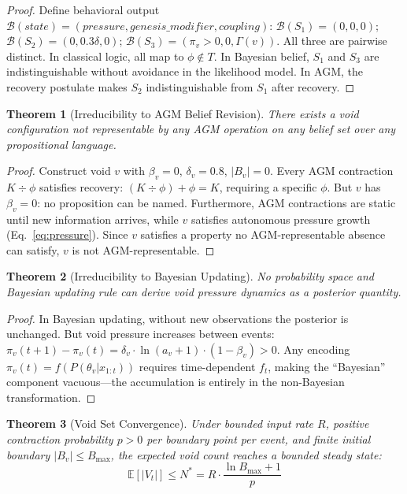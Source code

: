 \documentclass[11pt]{article}
\newtheorem{theorem}{Theorem}[section]
\begin{document}
\begin{proof}
Define behavioral output $\mathcal{B}(state) = (pressure, genesis\_modifier, coupling)$:
$\mathcal{B}(S_1) = (0, 0, 0)$; $\mathcal{B}(S_2) = (0, 0.3\delta, 0)$; $\mathcal{B}(S_3) = (\pi_v > 0, 0, \Gamma(v))$.
All three are pairwise distinct. In classical logic, all map to $\phi \notin T$. In Bayesian belief, $S_1$ and $S_3$ are indistinguishable without avoidance in the likelihood model. In AGM, the recovery postulate makes $S_2$ indistinguishable from $S_1$ after recovery.
\end{proof}

\begin{theorem}[Irreducibility to AGM Belief Revision]
\label{thm:void-agm}
There exists a void configuration not representable by any AGM operation on any belief set over any propositional language.
\end{theorem}

\begin{proof}
Construct void $v$ with $\beta_v = 0$, $\delta_v = 0.8$, $|B_v| = 0$. Every AGM contraction $K \div \phi$ satisfies recovery: $(K \div \phi) + \phi = K$, requiring a specific $\phi$. But $v$ has $\beta_v = 0$: no proposition can be named. Furthermore, AGM contractions are static until new information arrives, while $v$ satisfies autonomous pressure growth (Eq.~\ref{eq:pressure}). Since $v$ satisfies a property no AGM-representable absence can satisfy, $v$ is not AGM-representable.
\end{proof}

\begin{theorem}[Irreducibility to Bayesian Updating]
\label{thm:void-bayes}
No probability space and Bayesian updating rule can derive void pressure dynamics as a posterior quantity.
\end{theorem}

\begin{proof}
In Bayesian updating, without new observations the posterior is unchanged. But void pressure increases between events: $\pi_v(t+1) - \pi_v(t) = \delta_v \cdot \ln(a_v + 1) \cdot (1 - \beta_v) > 0$. Any encoding $\pi_v(t) = f(P(\theta_v | x_{1:t}))$ requires time-dependent $f_t$, making the ``Bayesian'' component vacuous---the accumulation is entirely in the non-Bayesian transformation.
\end{proof}

\begin{theorem}[Void Set Convergence]
\label{thm:void-convergence}
Under bounded input rate $R$, positive contraction probability $p > 0$ per boundary point per event, and finite initial boundary $|B_v| \leq B_{\max}$, the expected void count reaches a bounded steady state:
\begin{equation}
\mathbb{E}[|V_t|] \leq N^* = R \cdot \frac{\ln B_{\max} + 1}{p}
\end{equation}
\end{theorem}
\end{document}
